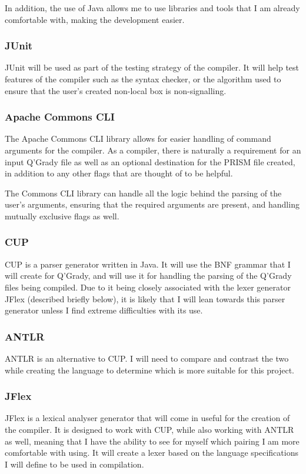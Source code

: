 \documentclass[11pt, a4paper]{article}
\begin{document}
In addition, the use of Java allows me to use libraries and tools that I am
already comfortable with, making the development easier.
\subsubsection{JUnit} %
\label{ssub:junit}
JUnit will be used as part of the testing strategy of the compiler. It will help
test features of the compiler such as the syntax checker, or the algorithm used
to ensure that the user's created non-local box is non-signalling.
\subsubsection{Apache Commons CLI} %
\label{ssub:apache_commons_cli}
The Apache Commons CLI library allows for easier handling of command arguments
for the compiler. As a compiler, there is naturally a requirement for an input
Q'Grady file as well as an optional destination for the PRISM file created, in
addition to any other flags that are thought of to be helpful. 

The Commons CLI library can handle all the logic behind the parsing of the
user's arguments, ensuring that the required arguments are present, and handling
mutually exclusive flags as well.
\subsubsection{CUP} %
CUP is a parser generator written in Java. It will use the BNF grammar that I
will create for Q'Grady, and will use it for handling the parsing of the Q'Grady
files being compiled. Due to it being closely associated with the lexer
generator JFlex (described briefly below), it is likely that I will lean towards
this parser generator unless I find extreme difficulties with its use.
\label{ssub:cup}

\subsubsection{ANTLR} %
ANTLR is an alternative to CUP. I will need to compare and contrast the two
while creating the language to determine which is more suitable for this
project.
\label{ssub:antlr}

\subsubsection{JFlex} %
\label{ssub:jflex}
JFlex is a lexical analyser generator that will come in useful for the creation
of the compiler. It is designed to work with CUP, while also working with ANTLR
as well, meaning that I have the ability to see for myself which pairing I am
more comfortable with using. It will create a lexer based on the language
specifications I will define to be used in compilation.
\end{document}
